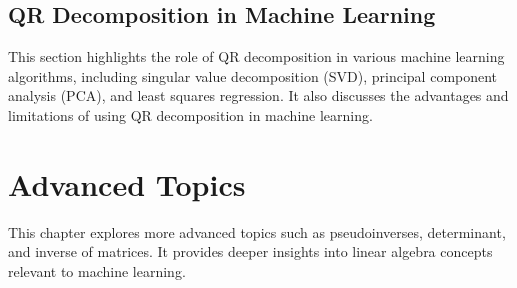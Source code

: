 \documentclass{report}%
\begin{document}
%
%
\section{QR Decomposition in Machine Learning}%
This section highlights the role of QR decomposition in various machine learning algorithms, including singular value decomposition (SVD), principal component analysis (PCA), and least squares regression. It also discusses the advantages and limitations of using QR decomposition in machine learning.

%
\chapter{Advanced Topics}%
This chapter explores more advanced topics such as pseudoinverses, determinant, and inverse of matrices. It provides deeper insights into linear algebra concepts relevant to machine learning.

%
\end{document}
